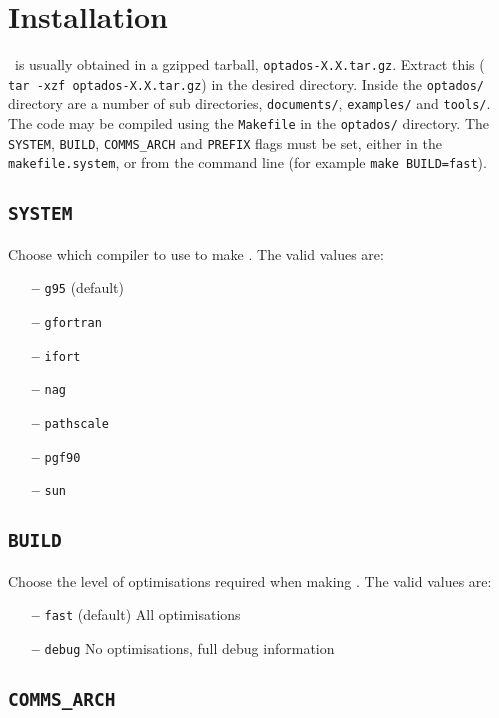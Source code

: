 \documentclass[a4paper,11pt,twoside]{book}
\begin{document}
\section{Installation}
\optados\ is usually obtained in a gzipped tarball, \verb#optados-X.X.tar.gz#. Extract this ( \verb# tar -xzf optados-X.X.tar.gz#) in the desired directory. Inside the  \verb#optados/# directory are a number of sub directories,  \verb#documents/#,   \verb#examples/# and \verb#tools/#.  The code may be compiled using the \verb#Makefile# in the  \verb#optados/# directory.  The \verb#SYSTEM#, \verb#BUILD#, \verb#COMMS_ARCH# and \verb#PREFIX# flags must be set, either in the  \verb#makefile.system#, or from the command line (for example  \verb#make BUILD=fast#).  

\subsection[system]{\tt SYSTEM}

Choose which compiler to use to make \optados. The valid values are:
\begin{itemize}
\item[{\bf --}]  \verb#g95# (default)
\item[{\bf --}]  \verb#gfortran#
\item[{\bf --}]  \verb#ifort#
\item[{\bf --}]  \verb#nag#
\item[{\bf --}]  \verb#pathscale#
\item[{\bf --}]  \verb#pgf90#
\item[{\bf --}]  \verb#sun#
\end{itemize}

\subsection[build]{\tt BUILD}

Choose the level of optimisations required when making \optados.  The valid values are:
\begin{itemize}
\item[{\bf --}]  \verb#fast# (default) All optimisations
\item[{\bf --}]  \verb#debug# No optimisations, full debug information
\end{itemize}

\subsection[comms_arch]{\tt COMMS\_ARCH}
\end{document}
